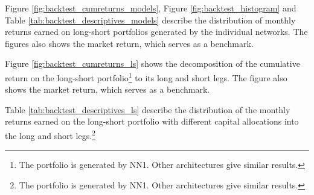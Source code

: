 		Figure \ref{fig:backtest_cumreturns_models}, Figure \ref{fig:backtest_histogram}  and Table \ref{tab:backtest_descriptives_models} describe the distribution of monthly returns earned on long-short portfolios generated by the individual networks. The figures also shows the market return, which serves as a benchmark. 
	
		Figure \ref{fig:backtest_cumreturns_ls} shows the decomposition of the cumulative return on the long-short portfolio\footnote{The portfolio is generated by NN1. Other architectures give similar results.} to its long and short legs. The figure also shows the market return, which serves as a benchmark.  
			
		Table \ref{tab:backtest_descriptives_ls} describe the distribution of the monthly returns earned on the long-short portfolio with different capital allocations into the long and short legs.\footnote{The portfolio is generated by NN1. Other architectures give similar results.} 
		
		
